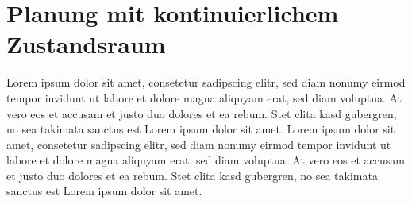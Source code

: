 \section{Planung mit kontinuierlichem Zustandsraum}
Lorem ipsum dolor sit amet, consetetur sadipscing elitr, sed diam nonumy eirmod tempor invidunt ut labore et dolore magna aliquyam erat, sed diam voluptua. At vero eos et accusam et justo duo dolores et ea rebum. Stet clita kasd gubergren, no sea takimata sanctus est Lorem ipsum dolor sit amet. Lorem ipsum dolor sit amet, consetetur sadipscing elitr, sed diam nonumy eirmod tempor invidunt ut labore et dolore magna aliquyam erat, sed diam voluptua. At vero eos et accusam et justo duo dolores et ea rebum. Stet clita kasd gubergren, no sea takimata sanctus est Lorem ipsum dolor sit amet.

 
